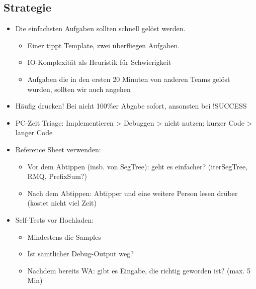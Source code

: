 \columnbreak
\subsection{Strategie}

\begin{itemize}
	\item Die einfachsten Aufgaben sollten schnell gelöst werden.
	\begin{itemize}
		\item Einer tippt Template, zwei überfliegen Aufgaben.
		\item IO-Komplexität als Heuristik für Schwierigkeit
		\item Aufgaben die in den ersten 20 Minuten von anderen Teams gelöst wurden, sollten wir auch angehen
	\end{itemize}
	\item Häufig drucken! Bei nicht 100\%er Abgabe sofort, ansonsten bei !SUCCESS
	\item PC-Zeit Triage: Implementieren > Debuggen > nicht nutzen; kurzer Code > langer Code
	\item Reference Sheet verwenden:
	\begin{itemize}
		\item Vor dem Abtippen (insb. von SegTree): geht es einfacher? (iterSegTree, RMQ, PrefixSum?)
		\item Nach dem Abtippen: Abtipper und eine weitere Person lesen drüber (kostet nicht viel Zeit)
	\end{itemize}
	\item Self-Tests vor Hochladen:
	\begin{itemize}
		\item Mindestens die Samples
		\item Ist sämtlicher Debug-Output weg?
		\item Nachdem bereits WA: gibt es Eingabe, die richtig geworden ist? (max. 5 Min)
	\end{itemize}
\end{itemize}
